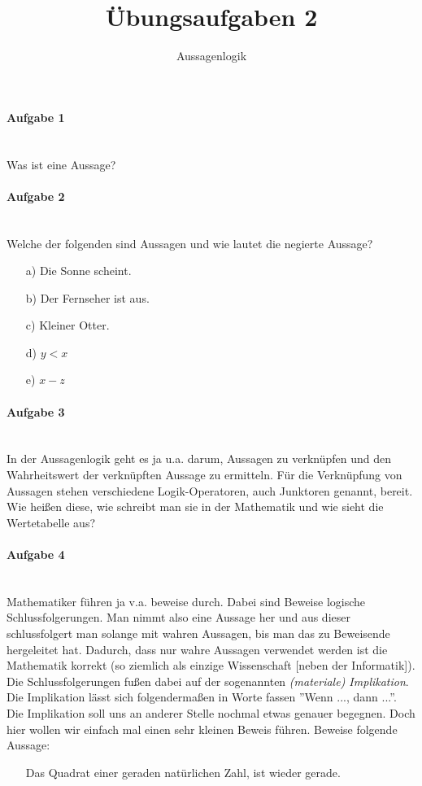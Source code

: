 \documentclass[12pt,a4paper,ngerman]{scrartcl}
\title{Übungsaufgaben 2}
\subtitle{Aussagenlogik}
\date{}
\begin{document}
	\maketitle
	
	\paragraph{Aufgabe 1}\mbox{}\\
	Was ist eine Aussage?
	
	\paragraph{Aufgabe 2}\mbox{}\\
	Welche der folgenden sind Aussagen und wie lautet die negierte Aussage?
	\begin{itemize}
		\item[a)] Die Sonne scheint.
		\item[b)] Der Fernseher ist aus.
		\item[c)] Kleiner Otter.
		\item[d)] $y < x$
		\item[e)] $x - z$
	\end{itemize}
	
	\paragraph{Aufgabe 3}\mbox{}\\	
	In der Aussagenlogik geht es ja u.a. darum, Aussagen zu verknüpfen und den Wahrheitswert der verknüpften Aussage zu ermitteln. Für die Verknüpfung von Aussagen stehen verschiedene Logik-Operatoren, auch Junktoren genannt, bereit. Wie heißen diese, wie schreibt man sie in der Mathematik und wie sieht die Wertetabelle aus?
	
	\paragraph{Aufgabe 4}\mbox{}\\	
	Mathematiker führen ja v.a. beweise durch. Dabei sind Beweise logische Schlussfolgerungen. Man nimmt also eine Aussage her und aus dieser schlussfolgert man solange mit wahren Aussagen, bis man das zu Beweisende hergeleitet hat. Dadurch, dass nur wahre Aussagen verwendet werden ist die Mathematik korrekt (so ziemlich als einzige Wissenschaft [neben der Informatik]). Die Schlussfolgerungen fußen dabei auf der sogenannten \emph{(materiale) Implikation}. Die Implikation lässt sich folgendermaßen in Worte fassen ''Wenn ..., dann ...''. Die Implikation soll uns an anderer Stelle nochmal etwas genauer begegnen. Doch hier wollen wir einfach mal einen sehr kleinen Beweis führen. Beweise folgende Aussage:
	\begin{itemize}
		\item[] Das Quadrat einer geraden natürlichen Zahl, ist wieder gerade.
	\end{itemize}
	
\end{document}

